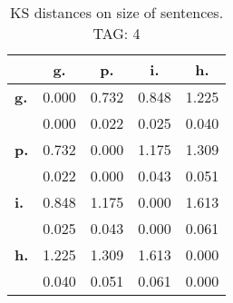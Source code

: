 \begin{table}[h!]
\begin{center}
\begin{tabular}{| l || c | c | c | c |}\hline
 & {\bf g.} & {\bf p.} & {\bf i.} & {\bf h.} \\\hline\hline
{\bf g.} & 0.000 & 0.732 & 0.848 & 1.225 \\
{\bf } & 0.000 & 0.022 & 0.025 & 0.040 \\\hline
{\bf p.} & 0.732 & 0.000 & 1.175 & 1.309 \\
{\bf } & 0.022 & 0.000 & 0.043 & 0.051 \\\hline
{\bf i.} & 0.848 & 1.175 & 0.000 & 1.613 \\
{\bf } & 0.025 & 0.043 & 0.000 & 0.061 \\\hline
{\bf h.} & 1.225 & 1.309 & 1.613 & 0.000 \\
{\bf } & 0.040 & 0.051 & 0.061 & 0.000 \\\hline
\end{tabular}
\caption{KS distances on size of sentences. TAG: 4}
\end{center}
\end{table}